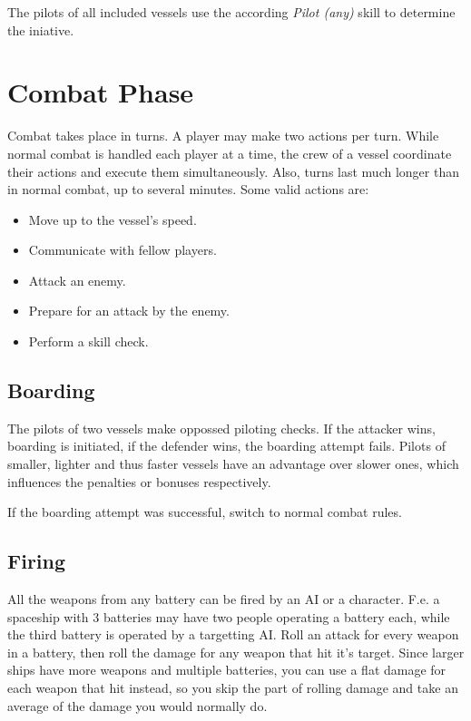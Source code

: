 The pilots of all included vessels use the according \emph{Pilot (any)} skill to determine the iniative.

\section{Combat Phase}
\label{sec:Vessels-Combat-Combat-Phase}

Combat takes place in turns. A player may make two actions per turn. While normal combat is handled each player at a time, the crew of a vessel coordinate their actions and execute them simultaneously. Also, turns last much longer than in normal combat, up to several minutes. Some valid actions are:

\begin{itemize}
  \item Move up to the vessel's speed.
  \item Communicate with fellow players.
  \item Attack an enemy.
  \item Prepare for an attack by the enemy.
  \item Perform a skill check.
\end{itemize}

\subsection{Boarding}
\label{sub:Vessels-Combat-Combat-Phase-Boarding}

The pilots of two vessels make oppossed piloting checks. If the attacker wins, boarding is initiated, if the defender wins, the boarding attempt fails. Pilots of smaller, lighter and thus faster vessels have an advantage over slower ones, which influences the penalties or bonuses respectively.

If the boarding attempt was successful, switch to normal combat rules.

\subsection{Firing}
\label{sub:Vessels-Combat-Combat-Phase-Firing}

All the weapons from any battery can be fired by an AI or a character. F.e. a spaceship with 3 batteries may have two people operating a battery each, while the third battery is operated by a targetting AI. Roll an attack for every weapon in a battery, then roll the damage for any weapon that hit it's target. Since larger ships have more weapons and multiple batteries, you can use a flat damage for each weapon that hit instead, so you skip the part of rolling damage and take an average of the damage you would normally do.

